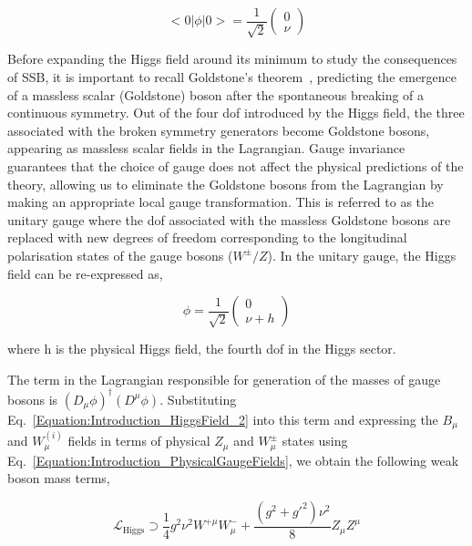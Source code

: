 \begin{equation}
    <0|\phi|0> = \frac{1}{\sqrt{2}} \begin{pmatrix}
        0 \\
        \nu
    \end{pmatrix}
\end{equation}
 
Before expanding the Higgs field around its minimum to study the consequences of SSB, it is important to recall Goldstone's theorem~\cite{Goldstone}, predicting the emergence of a massless scalar (Goldstone) boson after the spontaneous breaking of a continuous symmetry. Out of the four dof introduced by the Higgs field, the three associated with the broken symmetry generators become Goldstone bosons, appearing as massless scalar fields in the Lagrangian. Gauge invariance guarantees that the choice of gauge does not affect the physical predictions of the theory, allowing us to eliminate the Goldstone bosons from the Lagrangian by making an appropriate local gauge transformation. This is referred to as the unitary gauge where the dof associated with the massless Goldstone bosons are replaced with new degrees of freedom corresponding to the longitudinal polarisation states of the gauge bosons ($W^{\pm}/Z$). In the unitary gauge, the Higgs field can be re-expressed as,

\begin{equation}
    \phi = \frac{1}{\sqrt{2}}\begin{pmatrix}
        0 \\
        \nu + h
    \end{pmatrix} 
    \label{Equation:Introduction_HiggsField_2}
\end{equation}

where h is the physical Higgs field, the fourth dof in the Higgs sector.

The term in the Lagrangian responsible for generation of the masses of gauge bosons is $(D_\mu\phi)^\dagger(D^\mu\phi)$. Substituting Eq.~\ref{Equation:Introduction_HiggsField_2} into this term and expressing the $B_\mu$ and $W_{\mu}^{(i)}$ fields in terms of physical $Z_\mu$ and $W_{\mu}^{\pm}$ states using Eq.~\ref{Equation:Introduction_PhysicalGaugeFields}, we obtain the following weak boson mass terms,

\begin{equation}
    \mathcal{L}_{\text{Higgs}} \supset \frac{1}{4} g^2 \nu^2 W^{+\mu}W_{\mu}^- + \frac{(g^2+g'^2)\nu^2}{8} Z_\mu Z^\mu
\label{Equation:Introduction_HiggsLagrangian_2}
\end{equation}

